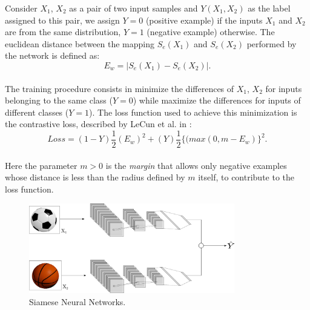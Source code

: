 Consider $X_1$, $X_2$ as a pair of two input samples and $Y(X_1, X_2)$ as the label assigned to this pair, we assign $Y = 0$ (positive example) if the inputs $X_1$ and $X_2$ are from the same distribution, $Y = 1$ (negative example) otherwise. The euclidean distance between the mapping $S_e(X_1)$ and $S_e(X_2)$ performed by the network is defined as:
\begin{equation}
E_w = \left|{S_e (X_1) - S_e (X_2)}\right|.
\end{equation}\\
The training procedure consists in minimize the differences of $X_1$, $X_2$ for inputs belonging to the same class ($Y = 0$) while maximize the differences for inputs of different classes ($Y = 1$).
The loss function used to achieve this minimization is the contrastive loss, described by LeCun et al. in \cite{chopra2005learning}:
\begin{equation}
Loss = (1 - Y)\frac{1}{2}(E_w)^2 + (Y)\frac{1}{2}\{(max(0, m - E_w)\}^2 .
\end{equation}\\
Here the parameter $m > 0$ is the \textit{margin} that allows only negative examples whose distance is less than the radius defined by $m$ itself, to contribute to the loss function.


\begin{figure}[h]
	\centering
	\includegraphics[width=0.8\textwidth]{img/siamese_balls}
	\caption[Siamese DNN]{Siamese Neural Networks.}
	\label{fig:siamese}
\end{figure}


